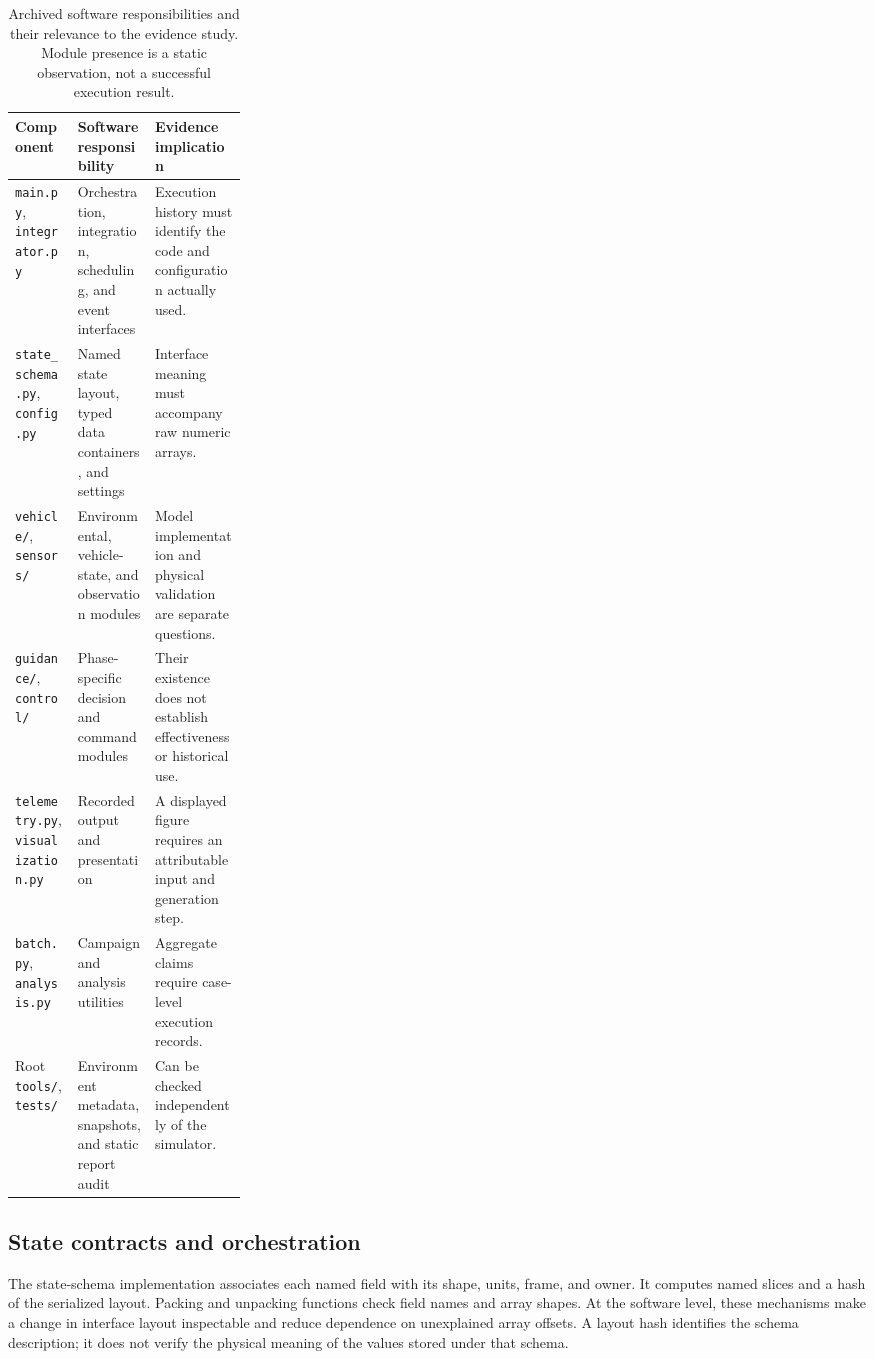 \documentclass[11pt,a4paper]{article}
\newcommand{\code}[1]{\texttt{#1}}
\begin{document}
\begin{table}[t]
\caption{Archived software responsibilities and their relevance to the evidence study. Module presence is a static observation, not a successful execution result.}
\label{tab:modules}
\small
\begin{tabularx}{\linewidth}{@{}p{0.27\linewidth}YY@{}}
\toprule
Component & Software responsibility & Evidence implication \\
\midrule
\code{main.py}, \code{integrator.py} & Orchestration, integration, scheduling, and event interfaces & Execution history must identify the code and configuration actually used. \\
\code{state\_schema.py}, \code{config.py} & Named state layout, typed data containers, and settings & Interface meaning must accompany raw numeric arrays. \\
\code{vehicle/}, \code{sensors/} & Environmental, vehicle-state, and observation modules & Model implementation and physical validation are separate questions. \\
\code{guidance/}, \code{control/} & Phase-specific decision and command modules & Their existence does not establish effectiveness or historical use. \\
\code{telemetry.py}, \code{visualization.py} & Recorded output and presentation & A displayed figure requires an attributable input and generation step. \\
\code{batch.py}, \code{analysis.py} & Campaign and analysis utilities & Aggregate claims require case-level execution records. \\
Root \code{tools/}, \code{tests/} & Environment metadata, snapshots, and static report audit & Can be checked independently of the simulator. \\
\bottomrule
\end{tabularx}
\end{table}

\subsection{State contracts and orchestration}
The state-schema implementation associates each named field with its shape, units, frame, and owner. It computes named slices and a hash of the serialized layout. Packing and unpacking functions check field names and array shapes. At the software level, these mechanisms make a change in interface layout inspectable and reduce dependence on unexplained array offsets. A layout hash identifies the schema description; it does not verify the physical meaning of the values stored under that schema.
\end{document}
